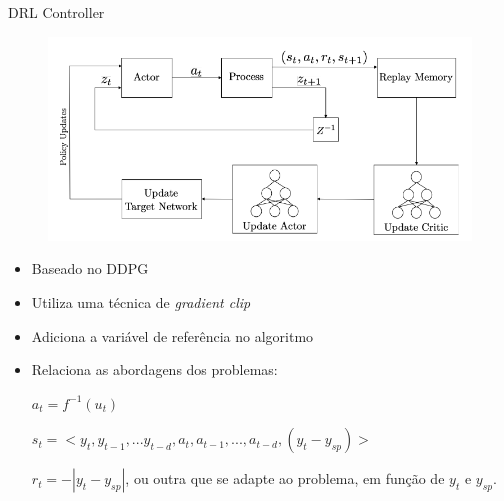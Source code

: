 \documentclass[pdf]{beamer}
\begin{document}
\begin{frame}{DRL Controller}
	
	\begin{subfigure}[t]{\textwidth}
		\centering
		\includegraphics[scale=0.5]{img/DRL_controller.png}
	\end{subfigure}
	\begin{itemize}
		\item Baseado no DDPG
		\item Utiliza uma técnica de \textit{gradient clip}
		\item Adiciona a variável de referência no algoritmo
		\item Relaciona as abordagens dos problemas:
		
		\subitem $ a_t = f^{-1}(u_t)$
		
		\subitem $ s_t = < y_t, y_{t-1}, ... y_{t-d}, a_t, a_{t-1}, ..., a_{t-d}, (y_t - y_{sp}) >$ 
		
		\subitem $ r_t = -| y_t - y_{sp}| $, ou outra que se adapte ao problema, em função de $ y_t  $ e $ y_{sp} $.
		
		
	\end{itemize}
\end{frame}
\end{document}

